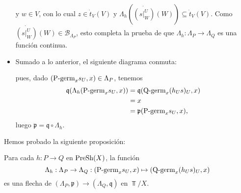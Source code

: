 \begin{itemize}
$$      $$
      y $w\in V$, con lo cual $z\in\dot{t}_{V}(V)$ y $\Lambda_h(\dot{(s|^{U}_{W})}(W))\subseteq \dot{t}_{V}(V)$. Como $\dot{(s|^{U}_{W})}(W)\in\mathcal{B}_{\Lambda_P}$, esto completa la prueba de que $\Lambda_h:\Lambda_P\to \Lambda_Q$ es una función continua.
   \item Sumado a lo anterior, el siguiente diagrama conmuta:
      
      pues, dado $(\normalfont{\text{P-germ}}_{x}s_{U},x)\in \Lambda_P$, tenemos
      $$
      \begin{aligned}
         \mathfrak{q}(\Lambda_h(\normalfont{\text{P-germ}}_{x}s_{U},x))&=\mathfrak{q}(\normalfont{\text{Q-germ}}_{x}(h_{U}s)_{U},x)\\
                                                   &=x\\
                                                   &=\mathfrak{p}(\normalfont{\text{P-germ}}_{x}s_{U},x),
      \end{aligned}
      $$
      luego $\mathfrak{p}=\mathfrak{q}\circ\Lambda_h$.
\end{itemize}
Hemos probado la siguiente proposición:
\begin{Prop}
   Para cada $h:P\to Q$ en $\normalfont{\text{PreSh}}(X)$, la función 
   $$
      \Lambda_h:\Lambda_P\to \Lambda_Q:(\normalfont{\text{P-germ}}_{x}s_{U},x)\mapsto (\normalfont{\text{Q-germ}}_{x}(h_{U}s)_{U},x)
   $$
   es una flecha de $(\Lambda_P,\mathfrak{p})\to(\Lambda_Q,\mathfrak{q})$ en $\Top/X$.
\end{Prop}

